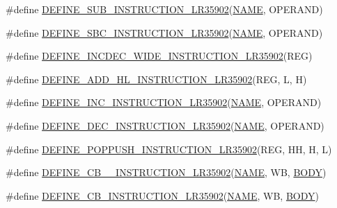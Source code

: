 \begin{DoxyCompactItemize}
\item 
\#define \mbox{\hyperlink{isa-lr35902_8c_a1808b056e65c96fea92bb610a36196fa}{D\+E\+F\+I\+N\+E\+\_\+\+S\+U\+B\+\_\+\+I\+N\+S\+T\+R\+U\+C\+T\+I\+O\+N\+\_\+\+L\+R35902}}(\mbox{\hyperlink{inflate_8h_a164ea0159d5f0b5f12a646f25f99eceaa67bc2ced260a8e43805d2480a785d312}{N\+A\+ME}},  O\+P\+E\+R\+A\+ND)
\item 
\#define \mbox{\hyperlink{isa-lr35902_8c_a52e05380a0a3e6cce189cd87bcc19b55}{D\+E\+F\+I\+N\+E\+\_\+\+S\+B\+C\+\_\+\+I\+N\+S\+T\+R\+U\+C\+T\+I\+O\+N\+\_\+\+L\+R35902}}(\mbox{\hyperlink{inflate_8h_a164ea0159d5f0b5f12a646f25f99eceaa67bc2ced260a8e43805d2480a785d312}{N\+A\+ME}},  O\+P\+E\+R\+A\+ND)
\item 
\#define \mbox{\hyperlink{isa-lr35902_8c_a709b12a6ba2c47cbef2d4d0e9c72ee2e}{D\+E\+F\+I\+N\+E\+\_\+\+I\+N\+C\+D\+E\+C\+\_\+\+W\+I\+D\+E\+\_\+\+I\+N\+S\+T\+R\+U\+C\+T\+I\+O\+N\+\_\+\+L\+R35902}}(R\+EG)
\item 
\#define \mbox{\hyperlink{isa-lr35902_8c_ad25f2cae8cbf7b4216dc4edaec3b3fba}{D\+E\+F\+I\+N\+E\+\_\+\+A\+D\+D\+\_\+\+H\+L\+\_\+\+I\+N\+S\+T\+R\+U\+C\+T\+I\+O\+N\+\_\+\+L\+R35902}}(R\+EG,  L,  H)
\item 
\#define \mbox{\hyperlink{isa-lr35902_8c_a61c163d65cac1659d02b8d28f81febd7}{D\+E\+F\+I\+N\+E\+\_\+\+I\+N\+C\+\_\+\+I\+N\+S\+T\+R\+U\+C\+T\+I\+O\+N\+\_\+\+L\+R35902}}(\mbox{\hyperlink{inflate_8h_a164ea0159d5f0b5f12a646f25f99eceaa67bc2ced260a8e43805d2480a785d312}{N\+A\+ME}},  O\+P\+E\+R\+A\+ND)
\item 
\#define \mbox{\hyperlink{isa-lr35902_8c_a746ff31b6713bdf629b4fed43f7f674d}{D\+E\+F\+I\+N\+E\+\_\+\+D\+E\+C\+\_\+\+I\+N\+S\+T\+R\+U\+C\+T\+I\+O\+N\+\_\+\+L\+R35902}}(\mbox{\hyperlink{inflate_8h_a164ea0159d5f0b5f12a646f25f99eceaa67bc2ced260a8e43805d2480a785d312}{N\+A\+ME}},  O\+P\+E\+R\+A\+ND)
\item 
\#define \mbox{\hyperlink{isa-lr35902_8c_ae0a0a8b08942c9f7ba2a696dbf51449e}{D\+E\+F\+I\+N\+E\+\_\+\+P\+O\+P\+P\+U\+S\+H\+\_\+\+I\+N\+S\+T\+R\+U\+C\+T\+I\+O\+N\+\_\+\+L\+R35902}}(R\+EG,  HH,  H,  L)
\item 
\#define \mbox{\hyperlink{isa-lr35902_8c_a9f057efe45467caaaec1c9642e860178}{D\+E\+F\+I\+N\+E\+\_\+\+C\+B\+\_\+\_\+\+I\+N\+S\+T\+R\+U\+C\+T\+I\+O\+N\+\_\+\+L\+R35902}}(\mbox{\hyperlink{inflate_8h_a164ea0159d5f0b5f12a646f25f99eceaa67bc2ced260a8e43805d2480a785d312}{N\+A\+ME}},  WB,  \mbox{\hyperlink{gzlog_8c_aa6bdf6a6d9916c343e1e17774d84a156}{B\+O\+DY}})
\item 
\#define \mbox{\hyperlink{isa-lr35902_8c_a22064acd9c378f27211a391857757a2b}{D\+E\+F\+I\+N\+E\+\_\+\+C\+B\+\_\+\+I\+N\+S\+T\+R\+U\+C\+T\+I\+O\+N\+\_\+\+L\+R35902}}(\mbox{\hyperlink{inflate_8h_a164ea0159d5f0b5f12a646f25f99eceaa67bc2ced260a8e43805d2480a785d312}{N\+A\+ME}},  WB,  \mbox{\hyperlink{gzlog_8c_aa6bdf6a6d9916c343e1e17774d84a156}{B\+O\+DY}})

\end{DoxyCompactItemize}
